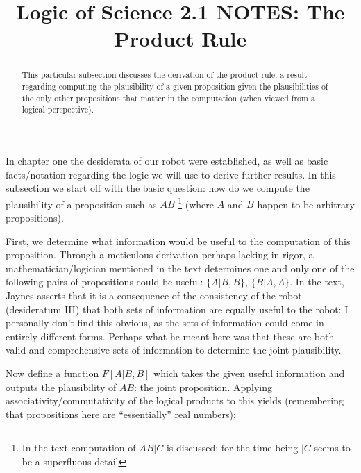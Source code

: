 \documentclass{article}
\begin{document}
\title{Logic of Science 2.1 NOTES: The Product Rule}

\maketitle 



\medskip 

\begin{abstract}

\noindent This particular subsection discusses the derivation of the product rule, a result regarding computing the plausibility of a given proposition given the plausibilities of the only other propositions that matter in the computation (when viewed from a logical perspective). 

\end{abstract}


\bigskip

\noindent \textbf{}

In chapter one the desiderata of our robot were established, as well as basic facts/notation regarding the logic we will use to derive further results. In this subsection we start off with the basic question: how do we compute the plausibility of a proposition such as $AB$ \footnote{In the text computation of $AB|C$ is discussed: for the time being $|C$ seems to be a superfluous detail} (where $A$ and $B$ happen to be arbitrary propositions). 

First, we determine what information would be useful to the computation of this proposition. Through a meticulous derivation perhaps lacking in rigor, a mathematician/logician mentioned in the text determines one and only one of the following pairs of propositions could be useful: $\{A|B, B\}$, $\{B|A, A\}$. In the text, Jaynes asserts that it is a consequence of the consistency of the robot (desideratum III) that both sets of information are equally useful to the robot: I personally don't find this obvious, as the sets of information could come in entirely different forms. Perhaps what he meant here was that these are both valid and comprehensive sets of information to determine the joint plausibility. 

Now define a function $F[A|B, B]$ which takes the given useful information and outputs the plausibility of $AB$: the joint proposition. Applying associativity/commutativity of the logical products to this yields (remembering that propositions here are ``essentially'' real numbers):
\end{document}
